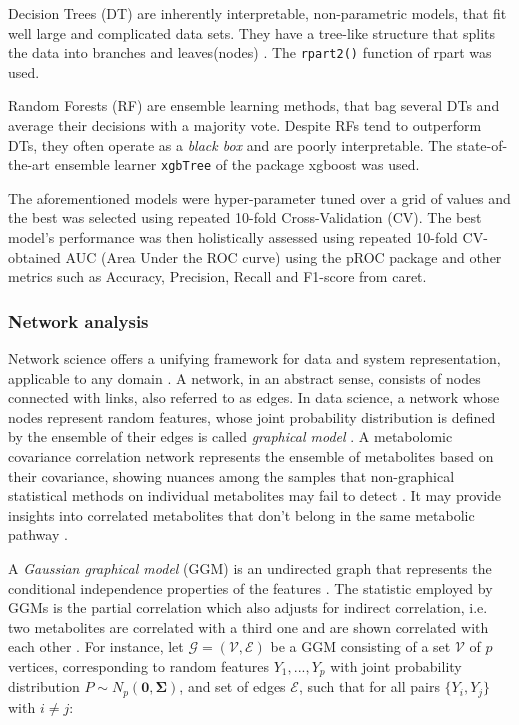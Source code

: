 \documentclass{amsart}
\theoremstyle{plain}
\begin{document}
Decision Trees (DT) are inherently interpretable, non-parametric models, that fit well large and complicated data sets. They have a tree-like structure that splits the data into branches and leaves(nodes) \cite{Song2015DecisionPrediction}. The \texttt{rpart2()} \cite{rpart} function of \textsf{rpart} was used.

Random Forests (RF) are ensemble learning methods, that bag several DTs and average their decisions with a majority vote. Despite RFs tend to outperform DTs, they often operate as a \textit{black box} and are poorly interpretable. The state-of-the-art ensemble learner \texttt{xgbTree} of the package \textsf{xgboost} \cite{Chen2016XGBoost:System} was used.

The aforementioned models were hyper-parameter tuned over a grid of values and the best was selected using repeated 10-fold Cross-Validation (CV). The best model's performance was then holistically assessed using repeated 10-fold CV-obtained AUC (Area Under the ROC curve) using the \textsf{pROC} package \cite{pROC} and other metrics such as Accuracy, Precision, Recall and F1-score from \textsf{caret}.

\subsubsection{Network analysis}
Network science offers a unifying framework for data and system representation, applicable to any domain \cite{Barabasi2015NetworkScience}. A network, in an abstract sense, consists of nodes connected with links, also referred to as edges. In data science, a network whose nodes represent random features, whose joint probability distribution is defined by the ensemble of their edges is called \textit{graphical model} \cite{Peeters2022Rags2ridges:Matrices}. A metabolomic covariance correlation network represents the ensemble of metabolites based on their covariance, showing nuances among the samples that non-graphical statistical methods on individual metabolites may fail to detect \cite{PerezDeSouza2020Network-basedInterpretation}. It may provide insights into correlated metabolites that don't belong in the same metabolic pathway \cite{PerezDeSouza2020Network-basedInterpretation}.


A \textit{Gaussian graphical model} (GGM) is an undirected graph that represents the conditional independence properties of the features \cite{KollerProbabilisticTechniques}. The statistic employed by GGMs is the partial correlation which also adjusts for indirect correlation, i.e. two metabolites are correlated with a third one and are shown correlated with each other \cite{Amara2022NetworksInterpretation}. For instance, let $\mathcal{G=(V,E)}$ be a GGM consisting of a set $\mathcal{V}$ of $p$ vertices, corresponding to random features $Y_1,...,Y_p$ with joint probability distribution $P \sim N_p(\mathbf{0, \Sigma})$, and set of edges $\mathcal{E}$, such that for all pairs $\{Y_i , Y_j\}$ with $i\neq j$:
\end{document}
